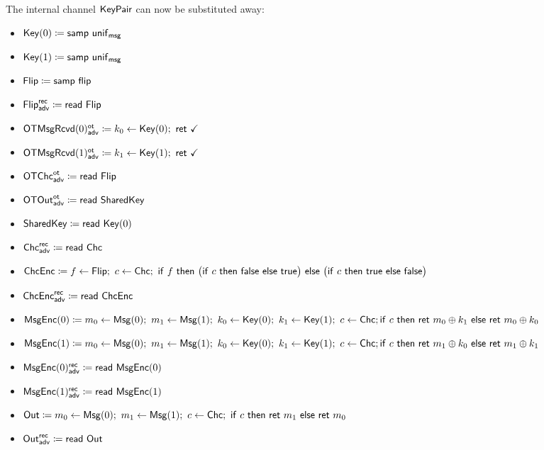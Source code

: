 \noindent The internal channel $\mathsf{KeyPair}$ can now be substituted away:

\begin{itemize}
\item $\mathsf{Key}(0) \coloneqq \mathsf{samp} \ \mathsf{unif}_{\mathsf{msg}}$
\item $\mathsf{Key}(1) \coloneqq \mathsf{samp} \ \mathsf{unif}_{\mathsf{msg}}$
\item $\mathsf{Flip} \coloneqq \mathsf{samp} \ \mathsf{flip}$
\item {\color{blue} $\mathsf{Flip}^{\mathsf{rec}}_{\mathsf{adv}} \coloneqq \mathsf{read} \ \mathsf{Flip}$}
\item {\color{blue} $\LeakOTMsgRcvd(0)^\ot_\adv \coloneqq k_0 \leftarrow \Key(0); \ \ret{\checkmark}$}
\item {\color{blue} $\LeakOTMsgRcvd(1)^\ot_\adv \coloneqq k_1 \leftarrow \Key(1); \ \ret{\checkmark}$}
\item {\color{blue} $\mathsf{OTChc}^{\mathsf{ot}}_{\mathsf{adv}} \coloneqq \mathsf{read} \ \mathsf{Flip}$}
\item {\color{blue} $\mathsf{OTOut}^{\mathsf{ot}}_{\mathsf{adv}} \coloneqq \mathsf{read} \ \mathsf{SharedKey}$}
\item {\color{red} $\mathsf{SharedKey} \coloneqq \mathsf{read} \ \mathsf{Key}(0)$}
\item {\color{blue} $\mathsf{Chc}^{\mathsf{rec}}_{\mathsf{adv}} \coloneqq \mathsf{read} \ \mathsf{Chc}$}
\item $\ChcEnc \coloneqq f \leftarrow \Flip; \ c \leftarrow \Chc; \ \ifte{f}{\big(\ifte{c}{\false}{\true}\big)}{\big(\ifte{c}{\true}{\false}\big)}$
\item {\color{blue} $\mathsf{ChcEnc}^{\mathsf{rec}}_{\mathsf{adv}} \coloneqq \mathsf{read} \ \mathsf{ChcEnc}$}
\item {\color{red} $\mathsf{MsgEnc}(0) \coloneqq m_0 \leftarrow \mathsf{Msg}(0); \ m_1 \leftarrow \mathsf{Msg}(1); \ k_0 \leftarrow \mathsf{Key}(0); \ k_1 \leftarrow \mathsf{Key}(1); \ c \leftarrow \mathsf{Chc}; \\ \mathsf{if} \ c \ \mathsf{then} \ \mathsf{ret} \ m_0 \oplus k_1 \ \mathsf{else} \ \mathsf{ret} \ m_0 \oplus k_0$}
\item {\color{red} $\mathsf{MsgEnc}(1) \coloneqq m_0 \leftarrow \mathsf{Msg}(0); \ m_1 \leftarrow \mathsf{Msg}(1); \ k_0 \leftarrow \mathsf{Key}(0); \ k_1 \leftarrow \mathsf{Key}(1); \ c \leftarrow \mathsf{Chc}; \\ \mathsf{if} \ c \ \mathsf{then} \ \mathsf{ret} \ m_1 \oplus k_0 \ \mathsf{else} \ \mathsf{ret} \ m_1 \oplus k_1$}
\item {\color{blue} $\mathsf{MsgEnc}(0)^{\mathsf{rec}}_{\mathsf{adv}} \coloneqq \mathsf{read} \ \mathsf{MsgEnc}(0)$}
\item {\color{blue} $\mathsf{MsgEnc}(1)^{\mathsf{rec}}_{\mathsf{adv}} \coloneqq \mathsf{read} \ \mathsf{MsgEnc}(1)$}
\item $\Out \coloneqq m_0 \leftarrow \Msg(0); \ m_1 \leftarrow \Msg(1); \ c \leftarrow \Chc; \ \ifte{c}{\ret{m_1}}{\ret{m_0}}$
\item {\color{blue} $\mathsf{Out}^{\mathsf{rec}}_{\mathsf{adv}} \coloneqq \mathsf{read} \ \mathsf{Out}$}
\end{itemize}

